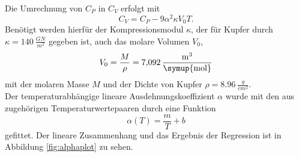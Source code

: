 Die Umrechnung von $C_P$ in $C_V$ erfolgt mit
\begin{equation}
  C_V = C_P-9\alpha ^2 \kappa V_0 T.
\end{equation}
Benötigt werden hierfür der Kompressionsmodul $\kappa$, der für Kupfer durch $\kappa= \SI{140}{\frac{GN}{m^2}}$ gegeben ist, auch das molare Volumen $V_0$,
\begin{equation}
	V_0=\frac{M}{\rho}=\SI{7,092}{\frac{m^3}{\symup{mol}}}
\end{equation}
mit der molaren Masse $M$ und der Dichte von Kupfer $\rho=\SI{8,96}{\frac{g}{cm^2}}$\cite{molaremassecu}.\\
Der temperaturabhängige lineare Ausdehnungskoeffizient $\alpha$ wurde mit den aus \cite{anleitung} zugehörigen Temperaturwertepaaren durch eine Funktion
\begin{equation}
	\alpha(T)=\frac{m}{T}+b
\end{equation}
gefittet. Der lineare Zusammenhang und das Ergebnis der Regression ist in Abbildung \ref{fig:alphaplot} zu sehen.







